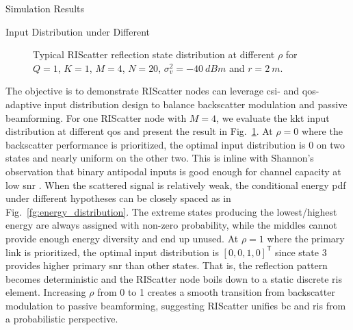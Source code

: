 \begin{section}{Simulation Results}
	\begin{subsection}{Input Distribution under Different }
		\begin{figure}[!t]
			\centering
			\resizebox{0.65\columnwidth}{!}{
				
			}
			\caption{Typical RIScatter reflection state distribution at different $\rho$ for $Q=1$, $K=1$, $M=4$, $N=20$, $\sigma_v^2=\qty{-40}{dBm}$ and $r=\qty{2}{m}$.}
			\label{fg:distribution_weights}
		\end{figure}
		The objective is to demonstrate RIScatter nodes can leverage \gls{csi}- and \gls{qos}-adaptive input distribution design to balance backscatter modulation and passive beamforming.
		For one RIScatter node with $M=4$, we evaluate the \gls{kkt} input distribution at different \gls{qos} and present the result in Fig.~\ref{fg:distribution_weights}.
		At $\rho=0$ where the backscatter performance is prioritized, the optimal input distribution is \num{0} on two states and nearly uniform on the other two.
		This is inline with Shannon's observation that binary antipodal inputs is good enough for channel capacity at low \gls{snr} \cite{Shannon1948}.
		When the scattered signal is relatively weak, the conditional energy \gls{pdf} under different hypotheses can be closely spaced as in Fig.~\ref{fg:energy_distribution}.
		The extreme states producing the lowest/highest energy are always assigned with non-zero probability, while the middles cannot provide enough energy diversity and end up unused.
		At $\rho=1$ where the primary link is prioritized, the optimal input distribution is $[0, 0, 1, 0]^\mathsf{T}$ since state 3 provides higher primary \gls{snr} than other states.
		That is, the reflection pattern becomes deterministic and the RIScatter node boils down to a static discrete \gls{ris} element.
		Increasing $\rho$ from \num{0} to \num{1} creates a smooth transition from backscatter modulation to passive beamforming, suggesting RIScatter unifies \gls{bc} and \gls{ris} from a probabilistic perspective.
	\end{subsection}


\end{section}
